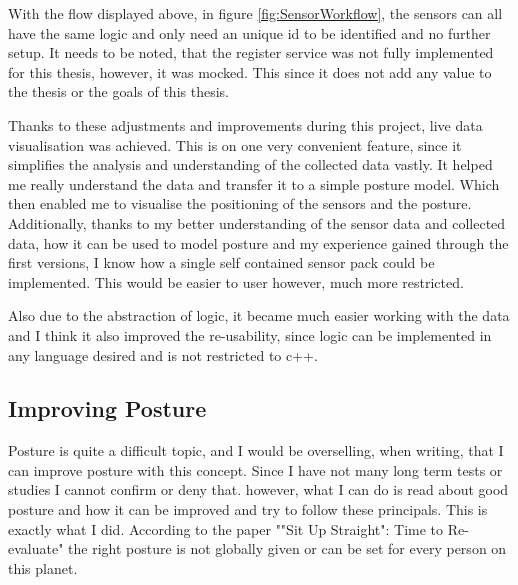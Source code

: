 With the flow displayed above, in figure \ref{fig:SensorWorkflow}, the sensors can all have the same logic and only need an unique id to be identified and no further setup. It needs to be noted, that the register service was not fully implemented for this thesis, however, it was mocked. This since it does not add any value to the thesis or the goals of this thesis.

Thanks to these adjustments and improvements during this project, live data visualisation was achieved. This is on one very convenient feature, since it simplifies the analysis and understanding of the collected data vastly. It helped me really understand the data and transfer it to a simple posture model. Which then enabled me to visualise the positioning of the sensors and the posture. Additionally, thanks to my better understanding of the sensor data and collected data, how it can be used to model posture and my experience gained through the first versions, I know how a single self contained sensor pack could be implemented. This would be easier to user however, much more restricted. 

Also due to the abstraction of logic, it became much easier working with the data and I think it also improved the re-usability, since logic can be implemented in any language desired and is not restricted to c++.

\subsection{Improving Posture}

Posture is quite a difficult topic, and I would be overselling, when writing, that I can improve posture with this concept. Since I have not many long term tests or studies I cannot confirm or deny that. however, what I can do is read about good posture and how it can be improved and try to follow these principals. This is exactly what I did. According to the paper ""Sit Up Straight": Time to Re-evaluate" \cite{SitUpSt77:online} the right posture is not globally given or can be set for every person on this planet. 

